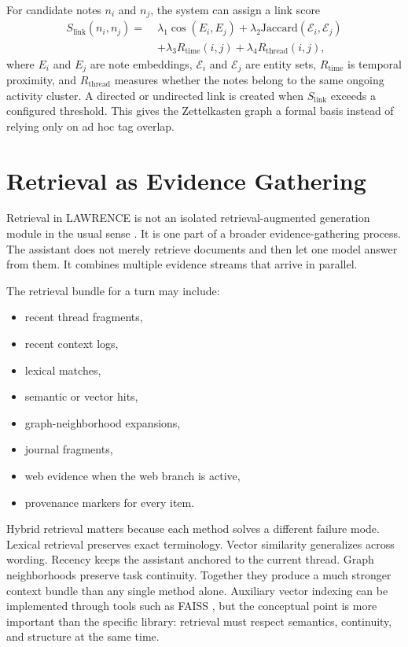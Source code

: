 \documentclass[conference]{IEEEtran}
\begin{document}
For candidate notes $n_i$ and $n_j$, the system can assign a link score
\begin{equation}
\label{eq:link}
\begin{aligned}
S_{\mathrm{link}}(n_i,n_j) =\;&
\lambda_1 \cos(E_i,E_j) +
\lambda_2 \mathrm{Jaccard}(\mathcal{E}_i,\mathcal{E}_j) \\
&+
\lambda_3 R_{\mathrm{time}}(i,j) +
\lambda_4 R_{\mathrm{thread}}(i,j),
\end{aligned}
\end{equation}
where $E_i$ and $E_j$ are note embeddings, $\mathcal{E}_i$ and $\mathcal{E}_j$ are entity sets, $R_{\mathrm{time}}$ is temporal proximity, and $R_{\mathrm{thread}}$ measures whether the notes belong to the same ongoing activity cluster. A directed or undirected link is created when $S_{\mathrm{link}}$ exceeds a configured threshold. This gives the Zettelkasten graph a formal basis instead of relying only on ad hoc tag overlap.

\section{Retrieval as Evidence Gathering}
Retrieval in LAWRENCE is not an isolated retrieval-augmented generation module in the usual sense \cite{lewis2020rag}. It is one part of a broader evidence-gathering process. The assistant does not merely retrieve documents and then let one model answer from them. It combines multiple evidence streams that arrive in parallel.

The retrieval bundle for a turn may include:

\begin{itemize}
\item recent thread fragments,
\item recent context logs,
\item lexical matches,
\item semantic or vector hits,
\item graph-neighborhood expansions,
\item journal fragments,
\item web evidence when the web branch is active,
\item provenance markers for every item.
\end{itemize}

Hybrid retrieval matters because each method solves a different failure mode. Lexical retrieval preserves exact terminology. Vector similarity generalizes across wording. Recency keeps the assistant anchored to the current thread. Graph neighborhoods preserve task continuity. Together they produce a much stronger context bundle than any single method alone. Auxiliary vector indexing can be implemented through tools such as FAISS \cite{johnson2021faiss}, but the conceptual point is more important than the specific library: retrieval must respect semantics, continuity, and structure at the same time.
\end{document}
